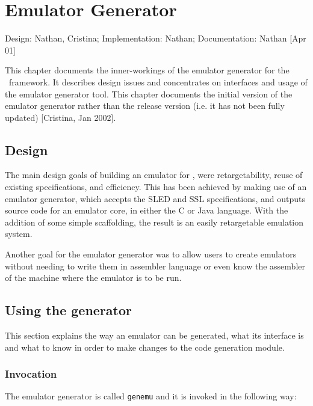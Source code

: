%
%

\chapter{Emulator Generator}
\label{ch-genemu}

{\small
\begin{flushright}
Design: Nathan, Cristina; Implementation: Nathan; Documentation: Nathan [Apr 01]
\end{flushright}
}

This chapter documents the inner-workings of the emulator generator 
for the \walk\ framework.  It describes design issues and concentrates 
on interfaces and usage of the emulator generator tool. 
This chapter documents the initial version of the emulator generator 
rather than the release version (i.e. it has not been fully updated) 
[Cristina, Jan 2002]. 


\section{Design}
The main design goals of building an emulator for \walk, were retargetability,
reuse of existing specifications, and efficiency. This has been achieved by
making use of an emulator generator, which accepts the SLED and SSL 
specifications, and outputs source code for an emulator core, in either the
C or Java language. With the addition of some simple scaffolding, the result 
is an easily retargetable emulation system.  

Another goal for the emulator generator was to allow users to create 
emulators without needing to write them in assembler language
or even know the assembler of the machine where the emulator is to 
be run. 


\section{Using the generator}
This section explains the way an emulator can be generated, 
what its interface is and what to know in order to make changes
to the code generation module. 


\subsection{Invocation}
The emulator generator is called \texttt{genemu} and it is invoked
in the following way: 

